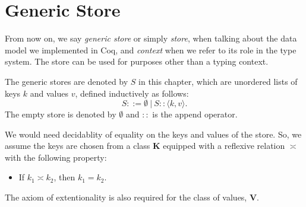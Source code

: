 \section{Generic Store}\label{chap:generic-store}

\newcommand{\angkv}{\langle k, v \rangle}
\newcommand{\angkvp}{\langle k', v' \rangle}

From now on, we say \textit{generic store} or simply \textit{store}, when talking about the data model we implemented in Coq, and \textit{context} when we refer to its role in the type system. The store can be used for purposes other than a typing context.

\begin{definition}
The generic stores are denoted by $S$ in this chapter, which are unordered lists of keys $k$ and values $v$, defined inductively as follows:
\begin{equation*}
S ::= \emptyset~|~S :: \angkv.
\end{equation*}
The empty store is denoted by $\emptyset$ and $::$ is the append operator.
\end{definition}

We would need decidablity of equality on the keys and values of the store. So, we assume the keys are chosen from a class $\mathbf{K}$ equipped with a reflexive relation $\asymp$ with the following property:
\begin{itemize}
    \item If $k_1 \asymp k_2$, then $k_1 = k_2$.
\end{itemize}
The axiom of extentionality is also required for the class of values, $\mathbf{V}$.







